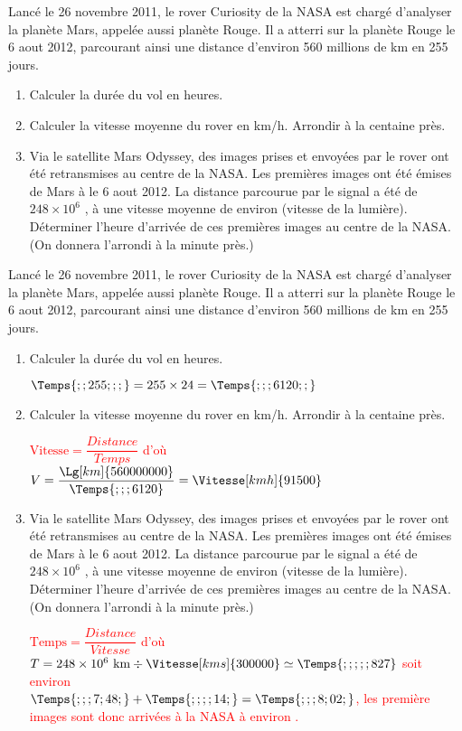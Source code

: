 \begin{exercice*}
    Lancé le 26 novembre 2011, le rover Curiosity de la NASA est chargé d’analyser la planète Mars, appelée aussi planète Rouge.
    Il a atterri sur la planète Rouge le 6 aout 2012, parcourant ainsi une distance d’environ 560 millions de km en 255 jours.
    \begin{enumerate}
        \item Calculer la durée du vol en heures.
        \item Calculer la vitesse moyenne du rover en km/h. Arrondir à la centaine près.
        \item Via le satellite Mars Odyssey, des images prises et envoyées par le rover ont été retransmises au centre de la NASA.
        Les premières images ont été émises de Mars à  le 6 aout 2012. La distance parcourue par le signal a été de
        $248\times 10^6$ \Lg[km]{}, à une vitesse moyenne de  environ (vitesse de la lumière).
        Déterminer l'heure d'arrivée de ces premières images au centre de la NASA. (On donnera l’arrondi à la minute près.)
    \end{enumerate}
\end{exercice*}
\begin{corrige}
    Lancé le 26 novembre 2011, le rover Curiosity de la NASA est chargé d’analyser la planète Mars, appelée aussi planète Rouge.
    Il a atterri sur la planète Rouge le 6 aout 2012, parcourant ainsi une distance d’environ 560 millions de km en 255 jours.
    \begin{enumerate}
        \item Calculer la durée du vol en heures.
        \par\textcolor{red}{$\Temps{;;255;;;} = 255\times 24 = \Temps{;;;6120;;}$}
        \item Calculer la vitesse moyenne du rover en km/h. Arrondir à la centaine près.
        \par\textcolor{red}{$\text{Vitesse}=\dfrac{Distance}{Temps}$ d'où $V=\dfrac{\Lg[km]{560000000}}{\Temps{;;;6120}}=\Vitesse[kmh]{91500}$}
        \item Via le satellite Mars Odyssey, des images prises et envoyées par le rover ont été retransmises au centre de la NASA.
        Les premières images ont été émises de Mars à  le 6 aout 2012. La distance parcourue par le signal a été de
        $248\times 10^6$ \Lg[km]{}, à une vitesse moyenne de  environ (vitesse de la lumière).
        Déterminer l'heure d'arrivée de ces premières images au centre de la NASA. (On donnera l’arrondi à la minute près.)
        \par\textcolor{red}{$\text{Temps}=\dfrac{Distance}{Vitesse}$ d'où $T=248\times 10^6~\text{km}\div\Vitesse[kms]{300000}\simeq \Temps{;;;;;827}$ soit environ \\
        $\Temps{;;;7;48;}+\Temps{;;;;14;} = \Temps{;;;8;02;}$, les première images sont donc arrivées à la NASA à environ .}
    \end{enumerate}
\end{corrige}

